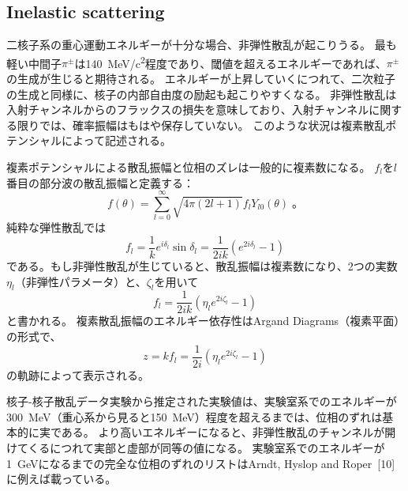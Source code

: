 \documentclass[a4paper,11pt,uplatex]{jsarticle}
\begin{document}
\subsection*{Inelastic scattering}
二核子系の重心運動エネルギーが十分な場合、非弾性散乱が起こりうる。
最も軽い中間子$\pi^{\pm}$は\SI{140}{MeV/c^2}程度であり、閾値を超えるエネルギーであれば、$\pi^{\pm}$の生成が生じると期待される。
エネルギーが上昇していくにつれて、二次粒子の生成と同様に、核子の内部自由度の励起も起こりやすくなる。
非弾性散乱は入射チャンネルからのフラックスの損失を意味しており、入射チャンネルに関する限りでは、確率振幅はもはや保存していない。
このような状況は複素散乱ポテンシャルによって記述される。

複素ポテンシャルによる散乱振幅と位相のズレは一般的に複素数になる。
$f_l$を$l$番目の部分波の散乱振幅と定義する：
\begin{equation}
  f(\theta)=\sum_{l=0}^\infty \sqrt{4\pi(2l+1)}f_lY_{l0}(\theta)\;。
\end{equation}
純粋な弾性散乱では
\begin{equation}
  f_l=\frac{1}{k}e^{i\delta_l}\sin{\delta_l}=\frac{1}{2ik}(e^{2i\delta_l}-1)
\end{equation}
である。もし非弾性散乱が生じていると、散乱振幅は複素数になり、2つの実数$\eta_{l}$（非弾性パラメータ）と、$\zeta_l$を用いて
\begin{equation}
  f_l=\frac{1}{2ik}(\eta_{l}e^{2i\zeta_l}-1)
\end{equation}
と書かれる。
複素散乱振幅のエネルギー依存性はArgand Diagrams（複素平面）の形式で、
\begin{equation}
  z=kf_l=\frac{1}{2i}(\eta_{l}e^{2i\zeta_l}-1)
\end{equation}
の軌跡によって表示される。

核子-核子散乱データ実験から推定された実験値は、実験室系でのエネルギーが\SI{300}{MeV}（重心系から見ると\SI{150}{MeV}）程度を超えるまでは、位相のずれは基本的に実である。
より高いエネルギーになると、非弾性散乱のチャンネルが開けてくるにつれて実部と虚部が同等の値になる。
実験室系でのエネルギーが\SI{1}{GeV}になるまでの完全な位相のずれのリストはArndt, Hyslop and Roper~[10]に例えば載っている。
\end{document}
